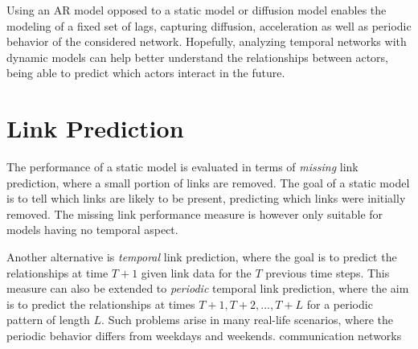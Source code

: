     Using an AR model opposed to a static model or diffusion model enables the modeling of a fixed set of lags, capturing diffusion, acceleration as well as periodic behavior of the considered network.
    Hopefully, analyzing temporal networks with dynamic models can help better understand the relationships between actors, being able to predict which actors interact in the future.

\section{Link Prediction}

    The performance of a static model is evaluated in terms of \emph{missing} link prediction, where a small portion of links are removed. The goal of a static model is to tell which links are likely to be present, predicting which links were initially removed. The missing link performance measure is however only suitable for models having no temporal aspect.
    
    Another alternative is \emph{temporal} link prediction, where the goal is to predict the relationships at time $T+1$ given link data for the $T$ previous time steps.
    This measure can also be extended to \emph{periodic} temporal link prediction, where the aim is to predict the relationships at times $T+1, T+2, ..., T+L$ for a periodic pattern of length $L$. Such problems arise in many real-life scenarios, where  the periodic behavior differs from weekdays and weekends.  communication networks 




    
